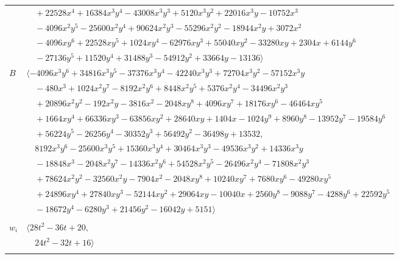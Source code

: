 \documentclass[11pt]{article}
\begin{document}
\begin{longtable}{@{}ll@{}}
 & $\quad +22528x^{4}+16384x^{3}y^{4}-43008x^{3}y^{3}+5120x^{3}y^{2}+22016x^{3}y-10752x^{3}$\\
 & $\quad -4096x^{2}y^{5}-25600x^{2}y^{4}+90624x^{2}y^{3}-55296x^{2}y^{2}-18944x^{2}y+3072x^{2}$\\
 & $\quad -4096xy^{6}+22528xy^{5}+1024xy^{4}-62976xy^{3}+55040xy^{2}-33280xy+2304x+6144y^{6}$\\
 & $\quad -27136y^{5}+11520y^{4}+31488y^{3}-54912y^{2}+33664y-13136\rangle$\\
$B$ & $\langle -4096x^{3}y^{6}+34816x^{3}y^{5}-37376x^{3}y^{4}-42240x^{3}y^{3}+72704x^{3}y^{2}-57152x^{3}y$\\
 & $\quad -480x^{3}+1024x^{2}y^{7}-8192x^{2}y^{6}+8448x^{2}y^{5}+5376x^{2}y^{4}-34496x^{2}y^{3}$\\
 & $\quad +20896x^{2}y^{2}-192x^{2}y-3816x^{2}-2048xy^{8}+4096xy^{7}+18176xy^{6}-46464xy^{5}$\\
 & $\quad +1664xy^{4}+66336xy^{3}-63856xy^{2}+28640xy+1404x-1024y^{9}+8960y^{8}-13952y^{7}-19584y^{6}$\\
 & $\quad +56224y^{5}-26256y^{4}-30352y^{3}+56492y^{2}-36498y+13532,$\\
 & $\quad 8192x^{3}y^{6}-25600x^{3}y^{5}+15360x^{3}y^{4}+30464x^{3}y^{3}-49536x^{3}y^{2}+14336x^{3}y$\\
 & $\quad -18848x^{3}-2048x^{2}y^{7}-14336x^{2}y^{6}+54528x^{2}y^{5}-26496x^{2}y^{4}-71808x^{2}y^{3}$\\
 & $\quad +78624x^{2}y^{2}-32560x^{2}y-7904x^{2}-2048xy^{8}+10240xy^{7}+7680xy^{6}-49280xy^{5}$\\
 & $\quad +24896xy^{4}+27840xy^{3}-52144xy^{2}+29064xy-10040x+2560y^{8}-9088y^{7}-4288y^{6}+22592y^{5}$\\
 & $\quad -18672y^{4}-6280y^{3}+21456y^{2}-16042y+5151\rangle$\\
\addlinespace[2pt]
\multicolumn{2}{@{}p{0.97\textwidth}@{}}{$i=19$, $D_i=4$, $\rho_{ij}$: $2{:}1, \allowbreak 3{:}2, \allowbreak 9{:}1, \allowbreak 11{:}2, \allowbreak 13{:}1, \allowbreak 15{:}2, \allowbreak 36{:}2, \allowbreak 44{:}2, \allowbreak 52{:}2, \allowbreak 53{:}2$}\\
$w_i$ & $\langle 28t^{2}-36t+20,$\\
 & $\quad 24t^{2}-32t+16\rangle$\\
\addlinespace[2pt]
\multicolumn{2}{@{}p{0.97\textwidth}@{}}{$i=20$, $D_i=2$, $\rho_{ij}$: $0{:}2, \allowbreak 1{:}1, \allowbreak 27{:}1, \allowbreak 34{:}2, \allowbreak 35{:}1, \allowbreak 44{:}1, \allowbreak 47{:}1, \allowbreak 54{:}1$}\\

\end{longtable}
\end{document}
